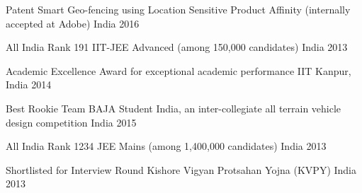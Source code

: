 
\begin{cvhonors}
	\cvhonor
	{Patent} %
	{Smart Geo-fencing using Location Sensitive Product Affinity (internally accepted at Adobe)} %
	{India} %
	{2016} %
	
	\cvhonor
	{All India Rank 191 } %
	{IIT-JEE Advanced (among 150,000 candidates)} %
	{India} %
	{2013} %
	
	\cvhonor
	{Academic Excellence Award} %
	{for exceptional academic performance} %
	{IIT Kanpur, India} %
	{2014} %
	
	\cvhonor
	{Best Rookie Team} %
	{BAJA Student India, an inter-collegiate all terrain vehicle design competition} %
	{India} %
	{2015} %
	
	\cvhonor
	{All India Rank 1234} %
	{JEE Mains (among 1,400,000 candidates)} %
	{India} %
	{2013} %
	
	\cvhonor
	{Shortlisted for Interview Round} %
	{Kishore Vigyan Protsahan Yojna (KVPY)} %
	{India} %
	{2013} %
	
\end{cvhonors}
